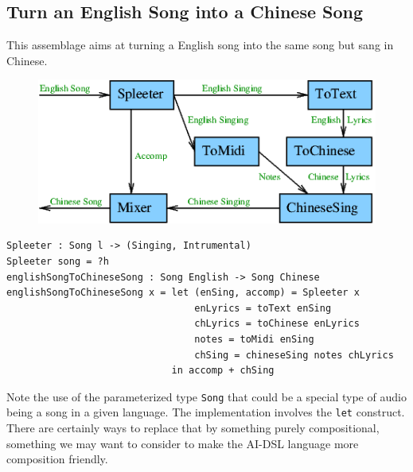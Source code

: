 \documentclass[]{article}
\begin{document}
\subsection{Turn an English Song into a Chinese Song}
This assemblage aims at turning a English song into the same song but
sang in Chinese.
\begin{figure}[H]
  \centering
  \includegraphics[scale=0.55]{figs/EnglishToChineseSong.png}
\end{figure}
\begin{verbatim}
Spleeter : Song l -> (Singing, Intrumental)
Spleeter song = ?h
englishSongToChineseSong : Song English -> Song Chinese
englishSongToChineseSong x = let (enSing, accomp) = Spleeter x
                                 enLyrics = toText enSing
                                 chLyrics = toChinese enLyrics
                                 notes = toMidi enSing
                                 chSing = chineseSing notes chLyrics
                             in accomp + chSing
\end{verbatim}
Note the use of the parameterized type \texttt{Song} that could be a
special type of audio being a song in a given language.  The
implementation involves the \texttt{let} construct.  There are
certainly ways to replace that by something purely compositional,
something we may want to consider to make the AI-DSL language more
composition friendly.
\end{document}
